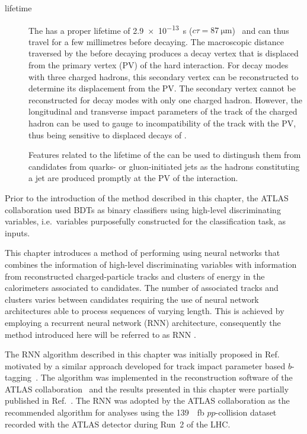 \begin{description}
\item[\taulepton lifetime] The \taulepton has a proper lifetime of
  \SI{2.9e-13}{\second}
  ($c \tau = \SI{87}{\micro\metre}$)~\cite{pdg2020} and can thus
  travel for a few millimetres before decaying. The macroscopic
  distance traversed by the \taulepton before decaying produces a
  decay vertex that is displaced from the primary vertex (PV) of the
  hard interaction. For \taulepton decay modes with three charged
  hadrons, this secondary vertex can be reconstructed to determine its
  displacement from the PV. The secondary vertex cannot be
  reconstructed for decay modes with only one charged hadron. However,
  the longitudinal and transverse impact parameters of the track of
  the charged hadron can be used to gauge to incompatibility of the
  track with the PV, thus being sensitive to displaced decays of
  \tauleptons.

  Features related to the lifetime of the \taulepton can be used to
  distingush them from \tauhadvis candidates from quarks- or
  gluon-initiated jets as the hadrons constituting a jet are produced
  promptly at the PV of the interaction.
\end{description}
Prior to the introduction of the method described in this chapter, the
ATLAS collaboration used BDTs as binary classifiers using high-level
discriminating variables, i.e.\ variables purposefully constructed for
the classification task, as inputs.

This chapter introduces a method of performing \tauid using neural
networks that combines the information of high-level discriminating
variables with information from reconstructed charged-particle tracks
and clusters of energy in the calorimeters associated to \tauhadvis
candidates. The number of associated tracks and clusters varies
between candidates requiring the use of neural network architectures
able to process sequences of varying length. This is achieved by
employing a recurrent neural network (RNN) architecture, consequently
the method introduced here will be referred to as RNN \tauid.

The RNN \tauid algorithm described in this chapter was initially
proposed in Ref.~\cite{cdeutsch-master} motivated by a similar
approach developed for track impact parameter based
$b$-tagging~\cite{ATL-PHYS-PUB-2017-003}. The algorithm was
implemented in the reconstruction software of the ATLAS
collaboration~\cite{ATL-SOFT-PUB-2021-001} and the results presented
in this chapter were partially published in
Ref.~\cite{ATL-PHYS-PUB-2019-033}. The RNN \tauid was adopted by the
ATLAS collaboration as the recommended \tauid algorithm for analyses
using the \SI{139}{\per\femto\barn} $pp$-collision dataset recorded
with the ATLAS detector during Run~2 of the LHC.

